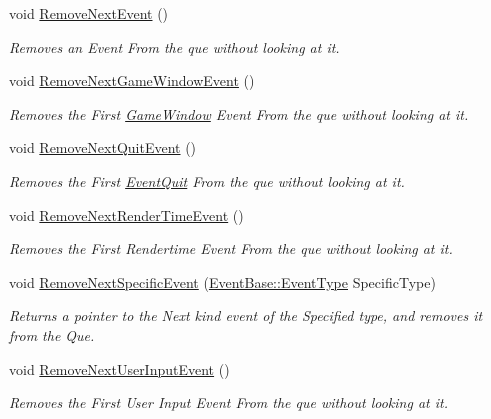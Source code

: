 \begin{DoxyCompactItemize}
void \hyperlink{classMezzanine_1_1EventManager_a0694b97c1b9696f5b28d0baf7a2f7c40}{RemoveNextEvent} ()
\begin{DoxyCompactList}\small\item\em Removes an Event From the que without looking at it. \item\end{DoxyCompactList}\item 
void \hyperlink{classMezzanine_1_1EventManager_a6108fd63aed85b5a3f38987f75603c53}{RemoveNextGameWindowEvent} ()
\begin{DoxyCompactList}\small\item\em Removes the First \hyperlink{classMezzanine_1_1GameWindow}{GameWindow} Event From the que without looking at it. \item\end{DoxyCompactList}\item 
void \hyperlink{classMezzanine_1_1EventManager_a10735469d564d6731c3741acf265879c}{RemoveNextQuitEvent} ()
\begin{DoxyCompactList}\small\item\em Removes the First \hyperlink{classMezzanine_1_1EventQuit}{EventQuit} From the que without looking at it. \item\end{DoxyCompactList}\item 
void \hyperlink{classMezzanine_1_1EventManager_a9a0b6340a0b0a6a96b7918f758f44c31}{RemoveNextRenderTimeEvent} ()
\begin{DoxyCompactList}\small\item\em Removes the First Rendertime Event From the que without looking at it. \item\end{DoxyCompactList}\item 
void \hyperlink{classMezzanine_1_1EventManager_a8fe12f47a64f3af8dcb30f13ee60e303}{RemoveNextSpecificEvent} (\hyperlink{classMezzanine_1_1EventBase_ab85e31e97753b7e7ecb098f82526baef}{EventBase::EventType} SpecificType)
\begin{DoxyCompactList}\small\item\em Returns a pointer to the Next kind event of the Specified type, and removes it from the Que. \item\end{DoxyCompactList}\item 
void \hyperlink{classMezzanine_1_1EventManager_a1d2681b16ec802f8271f2651ff40c083}{RemoveNextUserInputEvent} ()
\begin{DoxyCompactList}\small\item\em Removes the First User Input Event From the que without looking at it. \item\end{DoxyCompactList}\item 

\end{DoxyCompactItemize}
